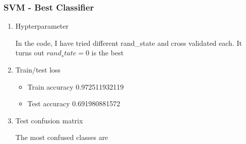 \documentclass[letterpaper, 12]{article}
\begin{document}
\subsubsection{SVM - Best Classifier}
\begin{enumerate}

    \item Hypterparameter
	
	In the code, I have tried different rand\_state and cross validated each. It turns out $rand_state = 0$ is the best
	
	\item Train/test loss
	\begin{itemize}
     \item  Train accuracy  0.972511932119
     \item Test accuracy 0.691980881572
        \end{itemize}
        \item Test confusion matrix
        
        The most confused classes are


\end{enumerate}
\end{document}
